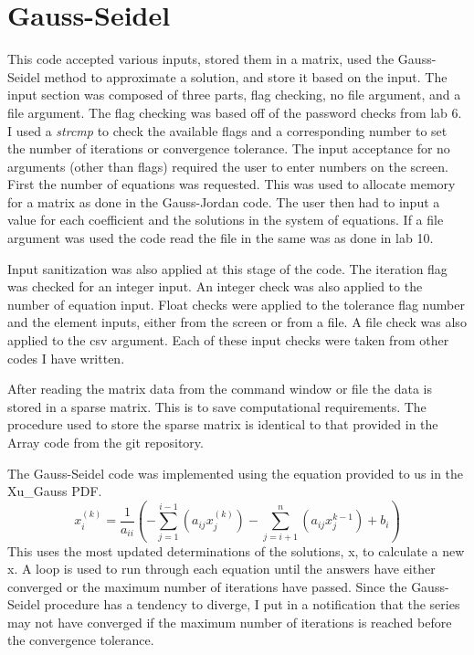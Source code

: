 \documentclass{article}
\begin{document}
\section{Gauss-Seidel}
This code accepted various inputs, stored them in a matrix, used the Gauss-Seidel method to approximate a solution, and store it based on the input. The input section was composed of three parts, flag checking, no file argument, and a file argument. The flag checking was based off of the password checks from lab 6. I used a \textit{strcmp} to check the available flags and a corresponding number to set the number of iterations or convergence tolerance. The input acceptance for no arguments (other than flags) required the user to enter numbers on the screen. First the number of equations was requested. This was used to allocate memory for a matrix as done in the Gauss-Jordan code. The user then had to input a value for each coefficient and the solutions in the system of equations. If a file argument was used the code read the file in the same was as done in lab 10.

Input sanitization was also applied at this stage of the code. The iteration flag was checked for an integer input. An integer check was also applied to the number of equation input. Float checks were applied to the tolerance flag number and the element inputs, either from the screen or from a file. A file check was also applied to the csv argument. Each of these input checks were taken from other codes I have written.

After reading the matrix data from the command window or file the data is stored in a sparse matrix. This is to save computational requirements. The procedure used to store the sparse matrix is identical to that provided in the Array code from the git repository.

The Gauss-Seidel code was implemented using the equation provided to us in the Xu\_Gauss PDF.
\begin{equation}
    x_i^{(k)} = \frac{1}{a_{ii}}(-\sum_{j=1}^{i-1}(a_{ij}x_j^{(k)}) -\sum_{j=i+1}^{n}(a_{ij}x_j^{k-1})+b_i)
\end{equation}
This uses the most updated determinations of the solutions, x, to calculate a new x. A loop is used to run through each equation until the answers have either converged or the maximum number of iterations have passed. Since the Gauss-Seidel procedure has a tendency to diverge, I put in a notification that the series may not have converged if the maximum number of iterations is reached before the convergence tolerance.
\end{document}
